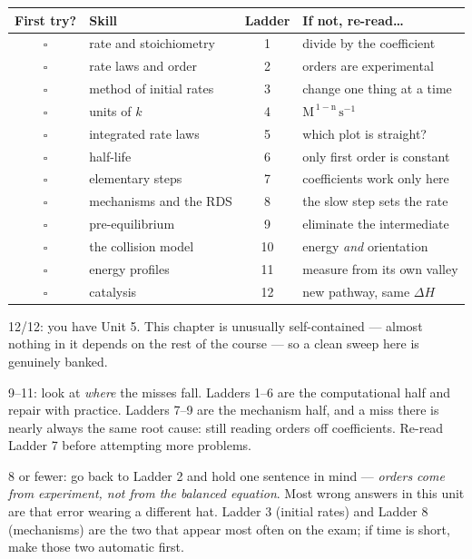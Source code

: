 \documentclass{apchem-worksheet}
\begin{document}
\renewcommand{\arraystretch}{1.3}
\noindent\begin{tabular}{@{}c p{5.9cm} c p{4.9cm}@{}}
\toprule
\textbf{First try?} & \textbf{Skill} & \textbf{Ladder} &
  \textbf{If not, re-read\ldots}\\
\midrule
$\square$ & rate and stoichiometry & 1 & divide by the coefficient \\
$\square$ & rate laws and order & 2 & orders are experimental \\
$\square$ & method of initial rates & 3 & change one thing at a time \\
$\square$ & units of $k$ & 4 & $\mathrm{M^{\,1-n}\,s^{-1}}$ \\
$\square$ & integrated rate laws & 5 & which plot is straight? \\
$\square$ & half-life & 6 & only first order is constant \\
$\square$ & elementary steps & 7 & coefficients work only here \\
$\square$ & mechanisms and the RDS & 8 & the slow step sets the rate \\
$\square$ & pre-equilibrium & 9 & eliminate the intermediate \\
$\square$ & the collision model & 10 & energy \emph{and} orientation \\
$\square$ & energy profiles & 11 & measure from its own valley \\
$\square$ & catalysis & 12 & new pathway, same $\Delta H$ \\
\bottomrule
\end{tabular}

\begin{apcnote}
12/12: you have Unit 5. This chapter is unusually self-contained ---
almost nothing in it depends on the rest of the course --- so a clean
sweep here is genuinely banked.

9--11: look at \emph{where} the misses fall. Ladders 1--6 are the
computational half and repair with practice. Ladders 7--9 are the
mechanism half, and a miss there is nearly always the same root cause:
still reading orders off coefficients. Re-read Ladder 7 before
attempting more problems.

8 or fewer: go back to Ladder 2 and hold one sentence in mind ---
\emph{orders come from experiment, not from the balanced equation}. Most
wrong answers in this unit are that error wearing a different hat.
Ladder 3 (initial rates) and Ladder 8 (mechanisms) are the two that
appear most often on the exam; if time is short, make those two
automatic first.
\end{apcnote}
\end{document}
